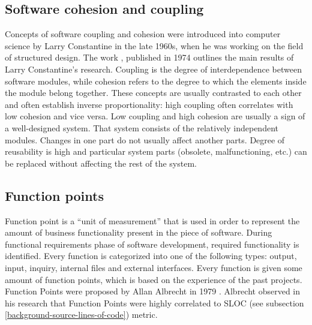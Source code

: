 \subsection{Software cohesion and coupling}
\label{background-cohesion-and-coupling}
\qquad Concepts of software coupling and cohesion were introduced into computer science by Larry Constantine in the late 1960s, when he was working on the field of structured design. The work \cite{cohesion-coupling-paper}, published in 1974 outlines the main results of Larry Constantine's research. Coupling is the degree of interdependence between software modules, while cohesion refers to the degree to which the elements inside the module belong together. These concepts are usually contrasted to each other and often establish inverse proportionality: high coupling often correlates with low cohesion and vice versa. Low coupling and high cohesion are usually a sign of a well-designed system. That system consists of the relatively independent modules. Changes in one part do not usually affect another parts. Degree of reusability is high and particular
system parts (obsolete, malfunctioning, etc.) can be replaced without affecting the rest of the system.

\subsection{Function points}
\label{background-function-points}
\qquad Function point is a “unit of measurement” that is used in order to represent the amount of business functionality present in the piece of software. During functional requirements phase of software development, required functionality is identified. Every function is categorized into one of the following types: output, input, inquiry, internal files and external interfaces. Every function is given some amount of function points, which is based on the experience of the past projects. Function Points were proposed by Allan Albrecht in 1979 \cite{function-points-paper}. Albrecht observed in his research that Function Points were highly correlated to SLOC (see subsection \ref{background-source-lines-of-code}) metric.

